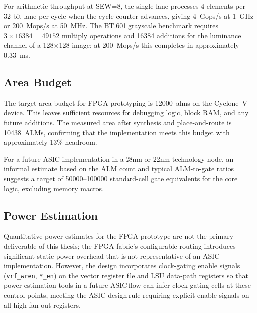 For arithmetic throughput at SEW=8, the single-lane processes 4 elements per 32-bit
lane per cycle when the cycle counter advances, giving 4~Gops/s at 1~GHz or 200~Mops/s
at 50~MHz. The BT.601 grayscale benchmark requires $3 \times 16384 = 49152$ multiply
operations and 16384 additions for the luminance channel of a 128$\times$128 image;
at 200~Mops/s this completes in approximately 0.33~ms.

\subsection{Area Budget}

The target area budget for FPGA prototyping is 12000~\glspl{alm} on the Cyclone~V
device. This leaves sufficient resources for debugging logic, block RAM, and any
future additions. The measured area after synthesis and place-and-route is 10438~ALMs,
confirming that the implementation meets this budget with approximately 13\% headroom.

For a future ASIC implementation in a 28nm or 22nm technology node, an informal
estimate based on the ALM count and typical ALM-to-gate ratios suggests a target
of 50000--100000 standard-cell gate equivalents for the core logic, excluding
memory macros.

\subsection{Power Estimation}

Quantitative power estimates for the FPGA prototype are not the primary deliverable
of this thesis; the FPGA fabric's configurable routing introduces significant static
power overhead that is not representative of an ASIC implementation. However, the
design incorporates clock-gating enable signals (\texttt{vrf\_wren}, \texttt{*\_en})
on the vector register file and LSU data-path registers so that power estimation tools
in a future ASIC flow can infer clock gating cells at these control points, meeting
the ASIC design rule requiring explicit enable signals on all high-fan-out registers.
